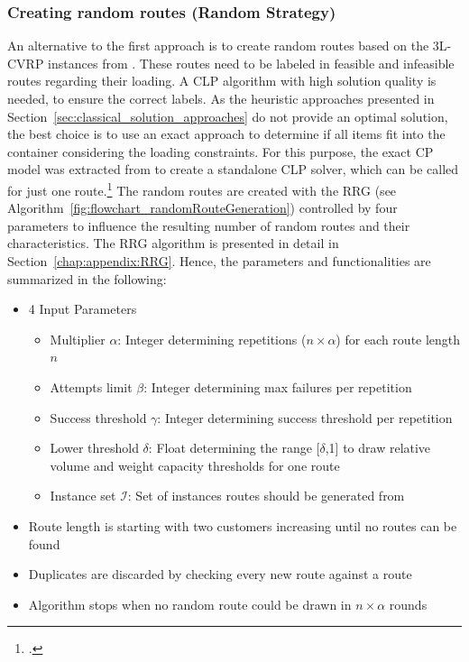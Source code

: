\subsubsection{Creating random routes (Random Strategy)}
An alternative to the first approach is to create random routes based on the \gls{3L-CVRP} instances from \gendreauDataSet.
These routes need to be labeled in feasible and infeasible routes regarding their loading.
A \gls{CLP} algorithm with high solution quality is needed, to ensure the correct labels. As the heuristic approaches
presented in Section~\ref{sec:classical_solution_approaches} do not provide an optimal solution,
the best choice is to use an exact approach to determine if all items fit into the container considering the loading constraints.
For this purpose, the exact \gls{CP} model was extracted from \cite{tamke_repository_2024} to create
a standalone \gls{CLP} solver, which can be called for just one route.\footcite[Stolen with permission from][]{tamke_repository_2024}
The random routes are created with the \gls{RRG} (see Algorithm~\ref{fig:flowchart_randomRouteGeneration}) controlled by four parameters to
influence the resulting number of random routes and their characteristics. The \gls{RRG} algorithm is presented in detail in Section~\ref{chap:appendix:RRG}.
Hence, the parameters and functionalities are summarized in the following:
\begin{itemize}
    \item 4 Input Parameters
          \begin{itemize}
              \item Multiplier $\alpha$: Integer determining repetitions ($n\times\alpha$) for each route length $n$
              \item  Attempts limit $\beta$: Integer determining max failures per repetition
              \item  Success threshold $\gamma$: Integer determining success threshold per repetition
              \item  Lower threshold $\delta$: Float determining the range [$\delta$,1] to draw relative volume and weight capacity thresholds for one route
              \item Instance set $\mathcal{I}$: Set of instances routes should be generated from
          \end{itemize}
    \item Route length is starting with two customers increasing until no routes can be found
    \item Duplicates are discarded by checking every new route against a route
    \item Algorithm stops when no random route could be drawn in $n \times \alpha$ rounds
\end{itemize}


